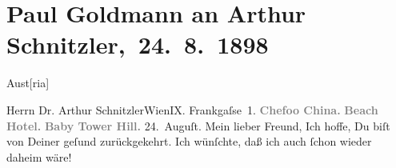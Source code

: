 

         
         \renewcommand{\erwaehntePersonen}{Personen: Richard Beer-Hofmann, Leo Van-Jung}
         \renewcommand{\erwaehnteInstitutionen}{Institutionen: Weinlaube}
         \renewcommand{\erwaehnteOrte}{Orte: Baby Tower Hill, Beach Hotel, Frankgasse, Hong Kong, Klosterneuburg, Wien, Yantai, Österreich}
         \renewcommand{\erwaehnteWerke}{}
               \section[ Paul Goldmann an Arthur Schnitzler, 24. 8. 1898]{ Paul Goldmann an Arthur Schnitzler, 24. 8. 1898}\nopagebreak{}\rehead{ }\begin{ledgroupsized}[t]{13cm}\normalsize\beginnumbering \toendnotes[C]{\smallbreak\pagebreak[2]} 
\toendnotes[C]{\smallbreak}\pstart{}{\pb}\begin{otherlanguage}{english}Aust{[}ria{]}\end{otherlanguage}\pend{}\pstart{}Herrn Dr. Arthur Schnitzler\pend{}\pstart{}Wien\pend{}\pstart{}IX. Frankgaſse 1.\pend{}{\bigskip}\pstart
           \noindent{}\centering{}{\pb}\textcolor{gray}{\textbf{Chefoo China.}}\pend
           \pstart
           \noindent{}\textcolor{gray}{\textbf{Beach Hotel.}}\pend
           \pstart
           \textcolor{gray}{\textbf{Baby Tower Hill.}}\pend
           \pstart
           \raggedleft{}24. Auguſt.\pend
           \pstart{}Mein lieber Freund,\pend\pstart
           Ich hoffe, Du biſt von Deiner \label{K_L02856-1v}\label{K_L02856-1h} geſund zurückgekehrt. Ich wünſchte, daß ich auch ſchon wieder daheim wäre!

\end{ledgroupsized}

